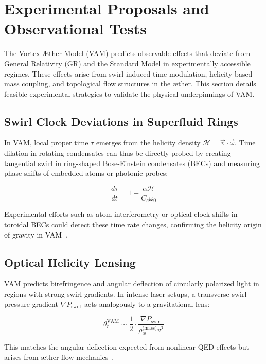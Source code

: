 \documentclass[12pt]{article}
\begin{document}
\section{Experimental Proposals and Observational Tests}
    The Vortex \AE{}ther Model (VAM) predicts observable effects that deviate from General Relativity (GR) and the Standard Model in experimentally accessible regimes. These effects arise from swirl-induced time modulation, helicity-based mass coupling, and topological flow structures in the æther. This section details feasible experimental strategies to validate the physical underpinnings of VAM.

    \subsection{Swirl Clock Deviations in Superfluid Rings}
    In VAM, local proper time $\tau$ emerges from the helicity density \( \mathcal{H} = \vec{v} \cdot \vec{\omega} \). Time dilation in rotating condensates can thus be directly probed by creating tangential swirl in ring-shaped Bose-Einstein condensates (BECs) and measuring phase shifts of embedded atoms or photonic probes:

    \begin{equation}
        \frac{d\tau}{dt} = 1 - \frac{\alpha \mathcal{H}}{C_e \omega_0}
    \end{equation}

    Experimental efforts such as atom interferometry or optical clock shifts in toroidal BECs could detect these time rate changes, confirming the helicity origin of gravity in VAM~\cite{pethick2008bose,kleckner2013creation,scheeler2014helicity}.

    \subsection{Optical Helicity Lensing}
    VAM predicts birefringence and angular deflection of circularly polarized light in regions with strong swirl gradients. In intense laser setups, a transverse swirl pressure gradient $ \nabla P_{\text{swirl}} $ acts analogously to a gravitational lens:

    \begin{equation}
        \theta_r^{\text{VAM}} \sim \frac{1}{2} \cdot \frac{\nabla P_{\text{swirl}}}{\rho_{\text{\ae}}^{\text{(mass)}} v^2}
    \end{equation}

    This matches the angular deflection expected from nonlinear QED effects but arises from æther flow mechanics~\cite{sarazin2016refraction,battesti2013qed,zhang2025simulation}.
\end{document}
